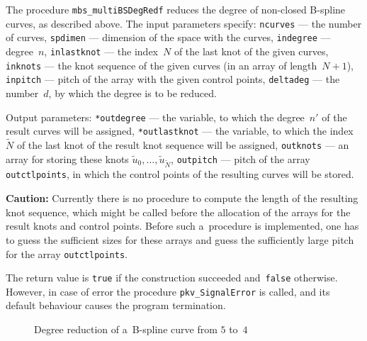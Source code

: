 \vspace{\bigskipamount}
The procedure \texttt{mbs\_multiBSDegRedf} reduces the degree of
non-closed B-spline curves, as described above. The input parameters
specify:
\texttt{ncurves} --- the number of curves, \texttt{spdimen} --- dimension
of the space with the curves, \texttt{indegree} --- degree~$n$,
\texttt{inlastknot} --- the index~$N$ of the last knot of the given curves,
\texttt{inknots} --- the knot sequence of the given curves (in an
array of length~$N+1$), \texttt{inpitch} --- pitch of the array with
the given control points, \texttt{deltadeg} --- the number~$d$, by which the
degree is to be reduced.

Output parameters: \texttt{*outdegree} --- the variable, to which the degree~$n'$
of the result curves will be assigned, \texttt{*outlastknot} ---
the variable, to which the index~$\tilde{N}$ of the last knot
of the result knot sequence will be assigned, \texttt{outknots} --- an array
for storing these knots $\tilde{u}_0,\ldots,\tilde{u}_{\tilde{N}}$,
\texttt{outpitch} --- pitch of the array \texttt{outctlpoints},
in which the control points of the resulting curves will be stored.

\vspace{\medskipamount}
\textbf{Caution:} Currently there is no procedure to compute the
length of the resulting knot sequence, which might be called before the
allocation of the arrays for the result knots and control points.
Before such a~procedure is implemented, one has to guess the sufficient
sizes for these arrays and guess the sufficiently large pitch
for the array \texttt{outctlpoints}.

The return value is \texttt{true} if the construction succeeded
and~\texttt{false} otherwise. However, in case of error
the procedure \texttt{pkv\_SignalError} is called, and its default behaviour
causes the program termination.


\begin{figure}[ht]
  \centerline{}
  \caption{Degree reduction of a~B-spline curve from $5$ to~$4$}
\end{figure}

